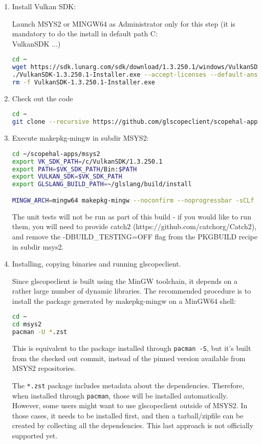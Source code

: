 \begin{enumerate}
\item Install Vulkan SDK:

Launch MSYS2 or MINGW64 as Administrator only for this step (it is mandatory to do the install in default path C:\\VulkanSDK ...)
\begin{lstlisting}[language=sh, numbers=none]
cd ~
wget https://sdk.lunarg.com/sdk/download/1.3.250.1/windows/VulkanSDK-1.3.250.1-Installer.exe
./VulkanSDK-1.3.250.1-Installer.exe --accept-licenses --default-answer --confirm-command install
rm -f VulkanSDK-1.3.250.1-Installer.exe
\end{lstlisting}

\item Check out the code

\begin{lstlisting}[language=sh, numbers=none]
cd ~
git clone --recursive https://github.com/glscopeclient/scopehal-apps
\end{lstlisting}

\item Execute makepkg-mingw in subdir MSYS2:

\begin{lstlisting}[language=sh, numbers=none]
cd ~/scopehal-apps/msys2
export VK_SDK_PATH=/c/VulkanSDK/1.3.250.1
export PATH=$VK_SDK_PATH/Bin:$PATH
export VULKAN_SDK=$VK_SDK_PATH
export GLSLANG_BUILD_PATH=~/glslang/build/install

MINGW_ARCH=mingw64 makepkg-mingw --noconfirm --noprogressbar -sCLf
\end{lstlisting}

The unit tests will not be run as part of this build - if you would like to run them, you will need to provide catch2
(https://github.com/catchorg/Catch2), and remove the -DBUILD\_TESTING=OFF flag from the PKGBUILD recipe in subdir
msys2.

\item Installing, copying binaries and running glscopeclient.

Since glscopeclient is built using the MinGW toolchain, it depends on a rather large number of dynamic libraries.
The recommended procedure is to install the package generated by makepkg-mingw on a MinGW64 shell:

\begin{lstlisting}[language=sh, numbers=none]
cd ~
cd msys2
pacman -U *.zst
\end{lstlisting}

This is equivalent to the package installed through \lstinline{pacman -S}, but it's built from the checked out commit,
instead of the pinned version available from MSYS2 repositories.

The \lstinline{*.zst} package includes metadata about the dependencies.
Therefore, when installed through \lstinline{pacman}, those will be installed automatically.
However, some users might want to use glscopeclient outside of MSYS2.
In those cases, it needs to be installed first, and then a tarball/zipfile can be created by collecting all the dependencies.
This last approach is not officially supported yet.

\end{enumerate}

